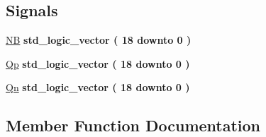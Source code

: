 \subsection*{Signals}
 \begin{DoxyCompactItemize}
\item 
\hyperlink{class_baud_rate_r_d_1_1simple_a5033df697b3b093f7df25224f8343c25}{N\+B} {\bfseries \textcolor{comment}{std\+\_\+logic\+\_\+vector}\textcolor{vhdlchar}{ }\textcolor{vhdlchar}{(}\textcolor{vhdlchar}{ }\textcolor{vhdlchar}{ } \textcolor{vhdldigit}{18} \textcolor{vhdlchar}{ }\textcolor{keywordflow}{downto}\textcolor{vhdlchar}{ }\textcolor{vhdlchar}{ } \textcolor{vhdldigit}{0} \textcolor{vhdlchar}{ }\textcolor{vhdlchar}{)}\textcolor{vhdlchar}{ }} 
\item 
\hyperlink{class_baud_rate_r_d_1_1simple_a193e599da42febaea5351ec3bb05dc52}{Qp} {\bfseries \textcolor{comment}{std\+\_\+logic\+\_\+vector}\textcolor{vhdlchar}{ }\textcolor{vhdlchar}{(}\textcolor{vhdlchar}{ }\textcolor{vhdlchar}{ } \textcolor{vhdldigit}{18} \textcolor{vhdlchar}{ }\textcolor{keywordflow}{downto}\textcolor{vhdlchar}{ }\textcolor{vhdlchar}{ } \textcolor{vhdldigit}{0} \textcolor{vhdlchar}{ }\textcolor{vhdlchar}{)}\textcolor{vhdlchar}{ }} 
\item 
\hyperlink{class_baud_rate_r_d_1_1simple_a4918b47ab83d6ff869ec1a9bda3866dd}{Qn} {\bfseries \textcolor{comment}{std\+\_\+logic\+\_\+vector}\textcolor{vhdlchar}{ }\textcolor{vhdlchar}{(}\textcolor{vhdlchar}{ }\textcolor{vhdlchar}{ } \textcolor{vhdldigit}{18} \textcolor{vhdlchar}{ }\textcolor{keywordflow}{downto}\textcolor{vhdlchar}{ }\textcolor{vhdlchar}{ } \textcolor{vhdldigit}{0} \textcolor{vhdlchar}{ }\textcolor{vhdlchar}{)}\textcolor{vhdlchar}{ }} 
\end{DoxyCompactItemize}


\subsection{Member Function Documentation}
\hypertarget{class_baud_rate_r_d_1_1simple_a7c5259303f711b909a8f262d2c698da0}{}
